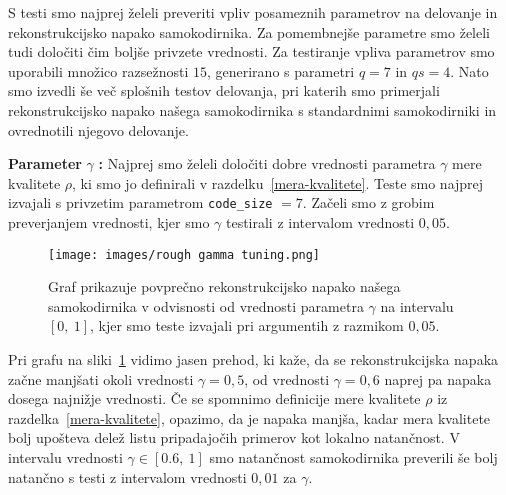 \documentclass[12pt,a4paper,twoside]{article}
\theoremstyle{definition} %
\theoremstyle{plain} %
\numberwithin{equation}{section}  %
\begin{document}


S testi smo najprej želeli preveriti vpliv posameznih parametrov na delovanje in rekonstrukcijsko napako samokodirnika.
Za pomembnejše parametre smo želeli tudi določiti čim boljše privzete vrednosti.
Za testiranje vpliva parametrov smo uporabili množico razsežnosti $15$, generirano s parametri $q=7$ in $qs=4$. %
Nato smo izvedli še več splošnih testov delovanja, pri katerih smo primerjali rekonstrukcijsko napako našega samokodirnika s standardnimi samokodirniki in ovrednotili njegovo delovanje.





\textbf{Parameter} $\gamma$ \textbf{:} Najprej smo želeli določiti dobre vrednosti parametra $\gamma$ mere kvalitete $\rho$, ki smo jo definirali v razdelku~\ref{mera-kvalitete}.
Teste smo najprej izvajali s privzetim parametrom \texttt{code\_size} $= 7$. %
Začeli smo z grobim preverjanjem vrednosti, kjer smo $\gamma$ testirali z intervalom vrednosti $0,05$.

\begin{figure}[h]
	\centering
	\texttt{[image: images/rough gamma tuning.png]}
	\caption[Pregled rekonstrukcijske napake glede na $\gamma$.]{Graf prikazuje povprečno rekonstrukcijsko napako našega 
	samokodirnika v odvisnosti od vrednosti parametra $\gamma$ na intervalu $[0,\ 1]$, kjer smo teste izvajali pri argumentih z razmikom $0,05$. }
	\label{fig:gamma_rough}
\end{figure}

Pri grafu na sliki~\ref{fig:gamma_rough} vidimo jasen prehod, ki kaže, da se rekonstrukcijska napaka začne manjšati okoli vrednosti $\gamma=0,5$, 
od vrednosti $\gamma=0,6$ naprej pa napaka dosega najnižje vrednosti.
Če se spomnimo definicije mere kvalitete $\rho$ iz razdelka~\ref{mera-kvalitete}, opazimo, da je napaka manjša, 
kadar mera kvalitete bolj upošteva delež listu pripadajočih primerov kot lokalno natančnost.
V intervalu vrednosti $\gamma \in [0.6,\ 1]$ smo natančnost samokodirnika preverili še bolj natančno s testi z intervalom vrednosti $0,01$ za $\gamma$.
\end{document}
